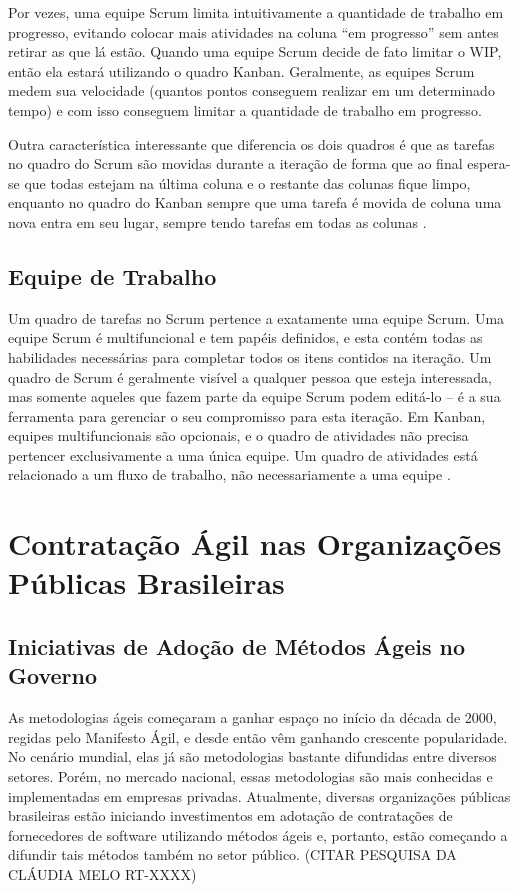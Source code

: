 Por vezes, uma equipe Scrum limita intuitivamente a quantidade de trabalho em progresso, evitando colocar mais atividades na coluna “em progresso” sem antes retirar as que lá estão. Quando uma equipe Scrum decide de fato limitar o WIP, então ela estará utilizando o quadro Kanban. Geralmente, as equipes Scrum medem sua velocidade (quantos pontos conseguem realizar em um determinado tempo) e com isso conseguem limitar a quantidade de trabalho em progresso.

Outra característica interessante que diferencia os dois quadros é que as tarefas no quadro do Scrum são movidas durante a iteração de forma que ao final espera-se que todas estejam na última coluna e o restante das colunas fique limpo, enquanto no quadro do Kanban sempre que uma tarefa é movida de coluna uma nova entra em seu lugar, sempre tendo tarefas em todas as colunas  \cite{kniberg2009}.

\subsection[Equipe de Trabalho]{Equipe de Trabalho}

Um quadro de tarefas no Scrum pertence a exatamente uma equipe Scrum. Uma equipe Scrum é multifuncional e tem papéis definidos, e esta contém todas as habilidades necessárias para completar todos os itens contidos na iteração. Um quadro de Scrum é geralmente visível a qualquer pessoa que esteja interessada, mas somente aqueles que fazem parte da equipe Scrum podem editá-lo – é a sua ferramenta para gerenciar o seu compromisso para esta iteração. Em Kanban, equipes multifuncionais são opcionais, e o quadro de atividades não precisa pertencer exclusivamente a uma única equipe. Um quadro de atividades está relacionado a um fluxo de trabalho, não necessariamente a uma equipe  \cite{kniberg2009}.

\section[Contratação Ágil nas Organizações Públicas Brasileiras]{Contratação Ágil nas Organizações Públicas Brasileiras}

\subsection[Iniciativas de Adoção de Métodos Ágeis no Governo]{Iniciativas de Adoção de Métodos Ágeis no Governo}

As metodologias ágeis começaram a ganhar espaço no início da década de 2000, regidas pelo Manifesto Ágil, e desde então vêm ganhando crescente popularidade. No cenário mundial, elas já são metodologias bastante difundidas entre diversos setores. Porém, no mercado nacional, essas metodologias são mais conhecidas e implementadas em empresas privadas. Atualmente, diversas organizações públicas brasileiras estão iniciando investimentos em adotação de contratações de fornecedores de software utilizando métodos ágeis e, portanto, estão começando a difundir tais métodos também no setor público. (CITAR PESQUISA DA CLÁUDIA MELO RT-XXXX)

